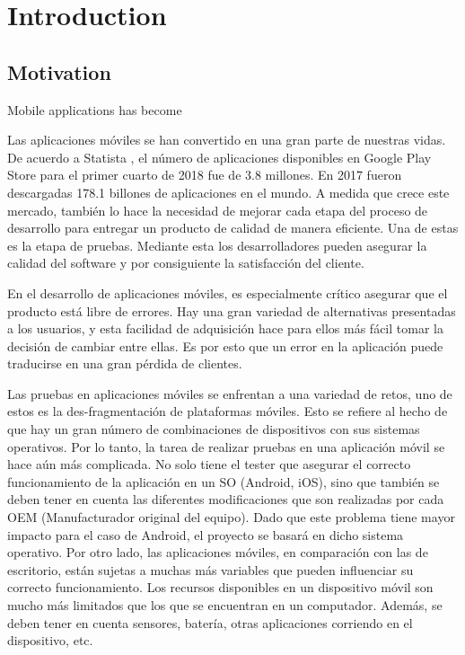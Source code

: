 %
\chapter{Introduction}
\label{sec:intro}

\section{Motivation}

Mobile applications has become

Las aplicaciones móviles se han convertido en una gran parte de nuestras vidas. De acuerdo a Statista \cite{MobileStatista}, el número de aplicaciones disponibles en Google Play Store para el primer cuarto de 2018 fue de 3.8 millones. En 2017 fueron descargadas 178.1 billones de aplicaciones en el mundo. A medida que crece este mercado, también lo hace la necesidad de mejorar cada etapa del proceso de desarrollo para entregar un producto de calidad de manera eficiente. Una de estas es la etapa de pruebas. Mediante esta los desarrolladores pueden asegurar la calidad del software y por consiguiente la satisfacción del cliente.

En el desarrollo de aplicaciones móviles, es especialmente crítico asegurar que el producto está libre de errores. Hay una gran variedad de alternativas presentadas a los usuarios, y esta facilidad de adquisición hace para ellos más fácil tomar la decisión de cambiar entre ellas. Es por esto que un error en la aplicación puede traducirse en una gran pérdida de clientes.

Las pruebas en aplicaciones móviles se enfrentan a una variedad de retos, uno de estos es la des-fragmentación de plataformas móviles. Esto se refiere al hecho de que hay un gran número de combinaciones de dispositivos con sus sistemas operativos. Por lo tanto, la tarea de realizar pruebas en una aplicación móvil se hace aún más complicada. No solo tiene el tester que asegurar el correcto funcionamiento de la aplicación en un SO (Android, iOS), sino que también se deben tener en cuenta las diferentes modificaciones que son realizadas por cada OEM (Manufacturador original del equipo). Dado que este problema tiene mayor impacto para el caso de Android, el proyecto se basará en dicho sistema operativo.
Por otro lado, las aplicaciones móviles, en comparación con las de escritorio, están sujetas a muchas más variables que pueden influenciar su correcto funcionamiento. Los recursos disponibles en un dispositivo móvil son mucho más limitados que los que se encuentran en un computador. Además, se deben tener en cuenta sensores, batería, otras aplicaciones corriendo en el dispositivo, etc.

